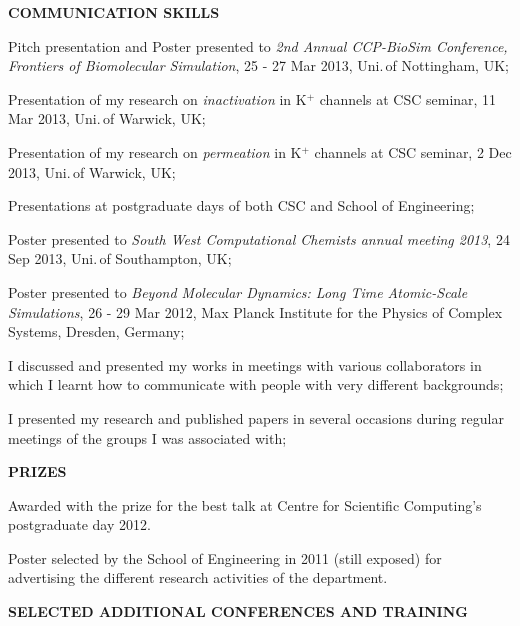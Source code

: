 \documentclass[a4paper,10pt,final]{letter}
\newcommand{\Sep}{\vspace{1em}}
\newcommand{\SmallSep}{\vspace{0.4em}}
\newcommand{\CVSection}[1]
	{\Large\textbf{#1}\par
	\SmallSep\normalsize\normalfont}
\begin{document}
\Sep
\CVSection{COMMUNICATION SKILLS}
\begin{compactitem}[\color{RoyalBlue}$\circ$]
\item Pitch presentation and Poster presented to \textit{2nd Annual CCP-BioSim Conference, Frontiers of
    Biomolecular Simulation}, 25 - 27 Mar 2013, Uni.\,of Nottingham, UK;
\item Presentation of my research on \emph{inactivation} in K$^+$ channels at
  CSC seminar, 11 Mar 2013, Uni.\,of Warwick, UK;
\item Presentation of my research on \emph{permeation} in K$^+$  channels at CSC
  seminar, 2 Dec 2013, Uni.\,of Warwick, UK;
\item Presentations at postgraduate days of both CSC and School of Engineering;
\item Poster presented to \textit{South West Computational Chemists annual
    meeting 2013}, 24 Sep 2013, Uni.\,of Southampton, UK;
\item Poster presented to \textit{Beyond Molecular Dynamics: Long Time Atomic-Scale Simulations}, 26 - 29 Mar 2012,
  Max Planck Institute for the Physics of Complex Systems, Dresden, Germany;
\item I discussed and presented my works in meetings with various collaborators in which I
  learnt how to communicate with people with very different backgrounds;
\item I presented my research and published papers in several occasions during regular
  meetings of the groups I was associated with;
\end{compactitem}

\Sep
\CVSection{PRIZES} 
\begin{compactitem}[\color{RoyalBlue}$\circ$]
\item Awarded with the prize for the best talk at Centre for Scientific Computing's postgraduate day 2012.
\item Poster selected by the School of Engineering in 2011 (still exposed) for advertising the
  different research activities of the department.
\end{compactitem}


\Sep
\CVSection{SELECTED ADDITIONAL CONFERENCES AND TRAINING} 
\end{document}
